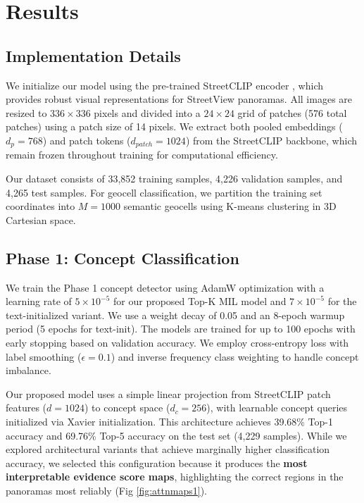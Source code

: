 \documentclass{article}
\begin{document}
\section{Results}

\subsection{Implementation Details}

We initialize our model using the pre-trained StreetCLIP encoder \cite{haas2023learning}, which provides robust visual representations for StreetView panoramas. All images are resized to $336 \times 336$ pixels and divided into a $24 \times 24$ grid of patches (576 total patches) using a patch size of 14 pixels. We extract both pooled embeddings ($d_p = 768$) and patch tokens ($d_{patch} = 1024$) from the StreetCLIP backbone, which remain frozen throughout training for computational efficiency.

Our dataset consists of 33,852 training samples, 4,226 validation samples, and 4,265 test samples. For geocell classification, we partition the training set coordinates into $M=1000$ semantic geocells using K-means clustering in 3D Cartesian space.

\subsection{Phase 1: Concept Classification}

We train the Phase 1 concept detector using AdamW optimization with a learning rate of $5 \times 10^{-5}$ for our proposed Top-K MIL model and $7 \times 10^{-5}$ for the text-initialized variant. We use a weight decay of 0.05 and an 8-epoch warmup period (5 epochs for text-init). The models are trained for up to 100 epochs with early stopping based on validation accuracy. We employ cross-entropy loss with label smoothing ($\epsilon = 0.1$) and inverse frequency class weighting to handle concept imbalance.

Our proposed model uses a simple linear projection from StreetCLIP patch features ($d=1024$) to concept space ($d_c=256$), with learnable concept queries initialized via Xavier initialization. This architecture achieves 39.68\% Top-1 accuracy and 69.76\% Top-5 accuracy on the test set (4,229 samples). While we explored architectural variants that achieve marginally higher classification accuracy, we selected this configuration because it produces the \textbf{most interpretable evidence score maps}, highlighting the correct regions in the panoramas most reliably (Fig \ref{fig:attnmaps1}).
\end{document}
